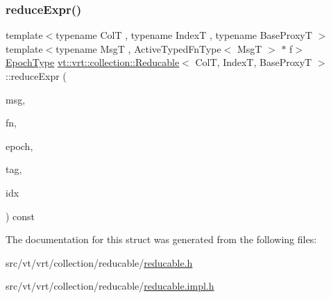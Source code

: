 \subsubsection{\texorpdfstring{reduce\+Expr()}{reduceExpr()}\hspace{0.1cm}{\footnotesize\ttfamily [2/2]}}
{\footnotesize\ttfamily template$<$typename ColT , typename IndexT , typename Base\+ProxyT $>$ \\
template$<$typename MsgT , Active\+Typed\+Fn\+Type$<$ Msg\+T $>$ $\ast$ f$>$ \\
\hyperlink{namespacevt_a985a5adf291c34a3ca263b3378388236}{Epoch\+Type} \hyperlink{structvt_1_1vrt_1_1collection_1_1_reducable}{vt\+::vrt\+::collection\+::\+Reducable}$<$ ColT, IndexT, Base\+ProxyT $>$\+::reduce\+Expr (\begin{DoxyParamCaption}\item[{MsgT $\ast$const}]{msg,  }\item[{\hyperlink{structvt_1_1vrt_1_1collection_1_1_reducable_a9f5a6c385efafe1fa52937f4809a9486}{Reduce\+Idx\+Func\+Type}}]{fn,  }\item[{\hyperlink{namespacevt_a985a5adf291c34a3ca263b3378388236}{Epoch\+Type} const \&}]{epoch,  }\item[{\hyperlink{namespacevt_a84ab281dae04a52a4b243d6bf62d0e52}{Tag\+Type} const \&}]{tag,  }\item[{IndexT const \&}]{idx }\end{DoxyParamCaption}) const}



The documentation for this struct was generated from the following files\+:\begin{DoxyCompactItemize}
\item 
src/vt/vrt/collection/reducable/\hyperlink{reducable_8h}{reducable.\+h}\item 
src/vt/vrt/collection/reducable/\hyperlink{reducable_8impl_8h}{reducable.\+impl.\+h}\end{DoxyCompactItemize}
